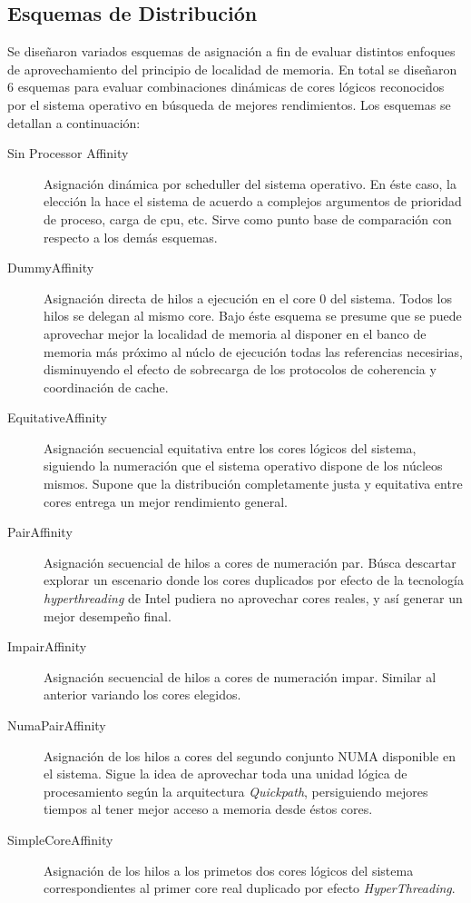 \subsection{Esquemas de Distribución}
Se diseñaron variados esquemas de asignación a fin de evaluar distintos enfoques de aprovechamiento del principio de localidad de memoria. En total se diseñaron 6 esquemas para evaluar combinaciones dinámicas de cores lógicos reconocidos por el sistema operativo en búsqueda de mejores rendimientos. Los esquemas se detallan a continuación:
\begin{description}
\item[Sin Processor Affinity] Asignación dinámica por scheduller del sistema operativo. En éste caso, la elección la hace el sistema de acuerdo a complejos argumentos de prioridad de proceso, carga de cpu, etc. Sirve como punto base de comparación con respecto a los demás esquemas.
\item[DummyAffinity] Asignación directa de hilos a ejecución en el core 0 del sistema. Todos los hilos se delegan al mismo core. Bajo éste esquema se presume que se puede aprovechar mejor la localidad de memoria al disponer en el banco de memoria más próximo al núclo de ejecución todas las referencias necesirias, disminuyendo el efecto de sobrecarga de los protocolos de coherencia y coordinación de cache.
\item[EquitativeAffinity] Asignación secuencial equitativa entre los cores lógicos del sistema, siguiendo la numeración que el sistema operativo dispone de los núcleos mismos. Supone que la distribución completamente justa y equitativa entre cores entrega un mejor rendimiento general.
\item[PairAffinity] Asignación secuencial de hilos a cores de numeración par. Búsca descartar explorar un escenario donde los cores duplicados por efecto de la tecnología \emph{hyperthreading} de Intel pudiera no aprovechar cores reales, y así generar un mejor desempeño final.
\item[ImpairAffinity] Asignación secuencial de hilos a cores de numeración impar. Similar al anterior variando los cores elegidos.
\item[NumaPairAffinity] Asignación de los hilos a cores del segundo conjunto NUMA disponible en el sistema. Sigue la idea de aprovechar toda una unidad lógica de procesamiento según la arquitectura \emph{Quickpath}, persiguiendo mejores tiempos al tener mejor acceso a memoria desde éstos cores.
\item[SimpleCoreAffinity] Asignación de los hilos a los primetos dos cores lógicos del sistema correspondientes al primer core real duplicado por efecto \emph{HyperThreading}.
\end{description}

